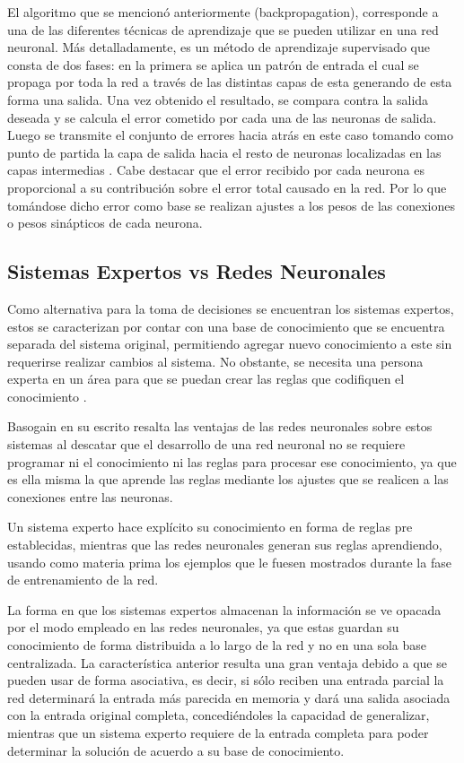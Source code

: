 	El algoritmo que se mencion\'{o} anteriormente (backpropagation), corresponde a
	una de las diferentes t\'{e}cnicas de aprendizaje que se pueden utilizar en una
	red neuronal. M\'{a}s detalladamente, es un m\'{e}todo de aprendizaje
	supervisado que consta de dos fases: en la primera se aplica un patr\'{o}n de entrada el cual se propaga por toda la red a trav\'{e}s de
las distintas capas de esta generando de esta forma una salida. Una vez obtenido
el resultado, se compara contra la salida deseada y se calcula el error cometido
por cada una de las neuronas de salida. Luego se transmite el conjunto de
errores hacia atr\'{a}s en este caso tomando como punto de partida la capa de
salida hacia el resto de neuronas localizadas en las capas intermedias
\cite{Fritsch1996}. Cabe destacar que el error recibido por cada neurona es
proporcional a su contribuci\'{o}n sobre el error total causado en la red. Por lo que tom\'{a}ndose dicho error como base se realizan ajustes a los pesos de las conexiones o pesos sin\'{a}pticos de cada neurona.

\subsection{Sistemas Expertos vs Redes Neuronales}
 
 		Como alternativa para la toma de decisiones se encuentran los sistemas
 	expertos, estos se caracterizan por contar con una base de conocimiento que
 	se encuentra separada del sistema original, permitiendo agregar nuevo
 	conocimiento a este sin requerirse realizar cambios al sistema. No obstante, se necesita una persona experta en un \'{a}rea para que se puedan crear las reglas que codifiquen el conocimiento \cite{Basogain}.
 	
 		Basogain en su escrito resalta las ventajas de las redes neuronales sobre
 	estos sistemas al descatar que el desarrollo de una red neuronal no se
 	requiere programar ni el conocimiento ni las reglas para procesar ese
 	conocimiento, ya que es ella misma la que aprende las reglas mediante los ajustes que se realicen a las conexiones entre las neuronas.
 		
 		Un sistema experto hace expl\'{i}cito su conocimiento en forma de reglas pre
 	establecidas, mientras que las redes neuronales generan sus reglas
 	aprendiendo, usando como materia prima los ejemplos que le fuesen mostrados
 	durante la fase de entrenamiento de la red.
 		
 			La forma en que los sistemas expertos almacenan la informaci\'{o}n se ve opacada
 	por el modo empleado en las redes neuronales, ya que estas guardan su
 	conocimiento de forma distribuida a lo largo de la red y no en una sola base
 	centralizada. La caracter\'{i}stica anterior resulta una gran ventaja debido a que se pueden usar de forma asociativa, es decir, si s\'{o}lo reciben una entrada parcial la red determinar\'{a} la entrada m\'{a}s parecida en memoria y dar\'{a} una salida asociada con la entrada original completa, concedi\'{e}ndoles la capacidad de generalizar, mientras que un sistema experto requiere de la entrada completa para poder determinar la soluci\'{o}n de acuerdo a su base de conocimiento.

